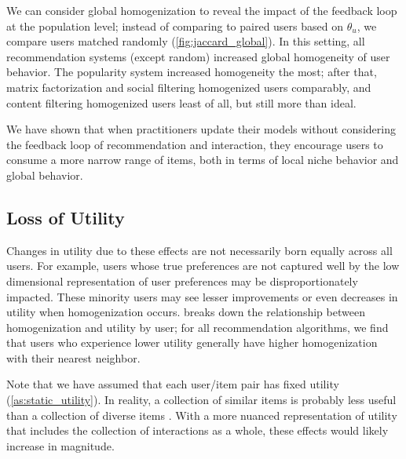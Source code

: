 \documentclass[sigconf]{acmart}
\begin{document}
We can consider global homogenization to reveal the impact of the feedback loop at the population level; instead of comparing to paired users based on $\theta_u$, we compare users matched randomly (\cref{fig:jaccard_global}).  In this setting, all recommendation systems (except random) increased global homogeneity of user behavior.  The popularity system increased homogeneity the most; after that, matrix factorization and social filtering homogenized users comparably, and content filtering homogenized users least of all, but still more than ideal.

We have shown that when practitioners update their models without considering the feedback loop of recommendation and interaction, they encourage users to consume a more narrow range of items, both in terms of local niche behavior and global behavior.


\subsection{Loss of Utility}
\label{sec:utility}

Changes in utility due to these effects are not necessarily born equally across all users.  For example, users whose true preferences are not captured well by the low dimensional representation of user preferences may be disproportionately impacted.  These minority users may see lesser improvements or even decreases in utility when homogenization occurs.   breaks down the relationship between homogenization and utility by user; for all recommendation algorithms, we find that users who experience lower utility generally have higher homogenization with their nearest neighbor.

Note that we have assumed that each user/item pair has fixed utility (\cref{as:static_utility}).  In reality, a collection of similar items is probably less useful than a collection of diverse items \cite{drosou2017diversity}.  With a more nuanced representation of utility that includes the collection of interactions as a whole, these effects would likely increase in magnitude.
\end{document}
